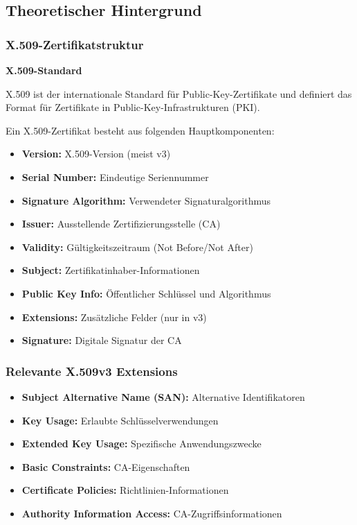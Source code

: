 \documentclass{article}
\begin{document}
\subsection{Theoretischer Hintergrund}

\subsubsection{X.509-Zertifikatstruktur}

\begin{infobox}
\textbf{X.509-Standard}

X.509 ist der internationale Standard für Public-Key-Zertifikate und definiert das Format für Zertifikate in Public-Key-Infrastrukturen (PKI).
\end{infobox}

Ein X.509-Zertifikat besteht aus folgenden Hauptkomponenten:

\begin{itemize}[leftmargin=1.5cm]
    \item \textbf{Version:} X.509-Version (meist v3)
    \item \textbf{Serial Number:} Eindeutige Seriennummer
    \item \textbf{Signature Algorithm:} Verwendeter Signaturalgorithmus
    \item \textbf{Issuer:} Ausstellende Zertifizierungsstelle (CA)
    \item \textbf{Validity:} Gültigkeitszeitraum (Not Before/Not After)
    \item \textbf{Subject:} Zertifikatinhaber-Informationen
    \item \textbf{Public Key Info:} Öffentlicher Schlüssel und Algorithmus
    \item \textbf{Extensions:} Zusätzliche Felder (nur in v3)
    \item \textbf{Signature:} Digitale Signatur der CA
\end{itemize}

\subsubsection{Relevante X.509v3 Extensions}

\begin{tcolorbox}[colback=thd-blue!10,colframe=thd-blue,title=\textbf{Wichtige Extensions}]
\begin{itemize}[leftmargin=1cm]
    \item \textbf{Subject Alternative Name (SAN):} Alternative Identifikatoren
    \item \textbf{Key Usage:} Erlaubte Schlüsselverwendungen
    \item \textbf{Extended Key Usage:} Spezifische Anwendungszwecke
    \item \textbf{Basic Constraints:} CA-Eigenschaften
    \item \textbf{Certificate Policies:} Richtlinien-Informationen
    \item \textbf{Authority Information Access:} CA-Zugriffsinformationen
\end{itemize}
\end{tcolorbox}
\end{document}
